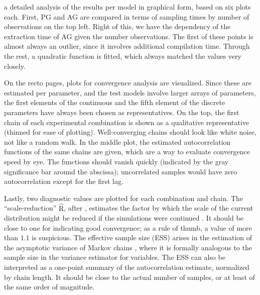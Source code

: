  a detailed analysis of the results per model in graphical form, based on six
plots each.  First, PG and AG are compared in terms of sampling times by number of observations on
the top left.  Right of this, we have the dependency of the extraction time of AG given the number
observations.  The first of these points is almost always an outlier, since it involves additional
compilation time.  Through the rest, a quadratic function is fitted, which always matched the values
very closely.

On the recto pages, plots for convergence analysis are visualized.  Since these are estimated per
parameter, and the test models involve larger arrays of parameters, the first elements of the
continuous and the fifth element of the discrete parameters have always been chosen as
representatives.  On the top, the first chain of each experimental combination is shown as a
qualitative representative (thinned for ease of plotting).  Well-converging chains should look like
white noise, not like a random walk.  In the middle plot, the estimated autocorrelation functions of
the same chains are given, which are a way to evaluate convergence speed by eye.  The functions
should vanish quickly (indicated by the gray significance bar around the abscissa); uncorrelated
samples would have zero autocorrelation except for the first lag.

Lastly, two diagnostic values are plotted for each combination and chain.  The
\enquote{scale-reduction} \(\widehat{\mathrm{R}}\), after \textcite{gelman1992inference}, estimates
the factor by which the scale of the current distribution might be reduced if the simulations were
continued \parencite[see][p. 285]{gelman2020bayesian}.  It should be close to one for indicating
good convergence; as a rule of thumb, a value of more than \(1.1\) is suspicious.  The effective
sample size (ESS) arises in the estimation of the asymptotic variance of Markov chains
\parencite[][section 7.2]{vihola2020lectures}, where it is formally analogous to the sample size in
the variance estimator for \iid{} variables.  The ESS can also be interpreted as a one-point summary
of the autocorrelation estimate, normalized by chain length.  It should be close to the actual
number of samples, or at least of the same order of magnitude.


